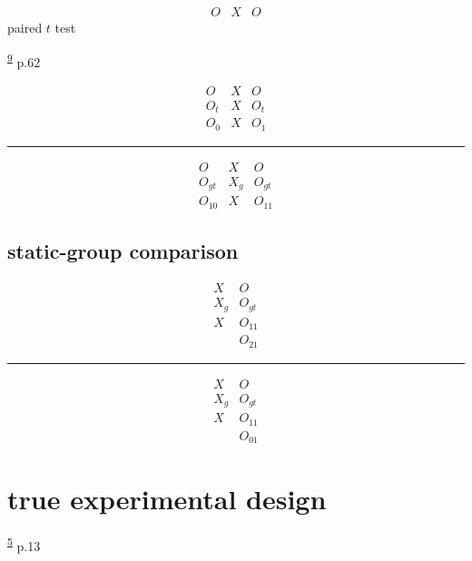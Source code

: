 \documentclass[
]{book}
\theoremstyle{definition}
\theoremstyle{definition}
\theoremstyle{definition}
\theoremstyle{definition}
\theoremstyle{remark}
\begin{document}
\[
\begin{array}{ccc}
O & X & O
\end{array}
\]
paired \(t\) test

\textsuperscript{\protect\hyperlink{ref-hu2022}{9}} p.62

\[
\begin{array}{ccc}
O & X & O \\
O_{t} & X & O_{t} \\
O_{0} & X & O_{1}
\end{array}
\]

\begin{center}\rule{0.5\linewidth}{0.5pt}\end{center}

\[
\begin{array}{ccc}
O & X & O \\
O_{gt} & X_{g} & O_{gt} \\
O_{10} & X & O_{11}
\end{array}
\]

\hypertarget{static-group-comparison}{%
\subsection{static-group comparison}\label{static-group-comparison}}

\[
\begin{array}{ccc}
X & O \\
X_{g} & O_{gt} \\
X & O_{11} \\
  & O_{21}
\end{array}
\]

\begin{center}\rule{0.5\linewidth}{0.5pt}\end{center}

\[
\begin{array}{ccc}
X & O \\
X_{g} & O_{gt} \\
X & O_{11} \\
  & O_{01}
\end{array}
\]

\hypertarget{true-experimental-design}{%
\section{true experimental design}\label{true-experimental-design}}

\textsuperscript{\protect\hyperlink{ref-campbell1963}{5}} p.13
\end{document}
